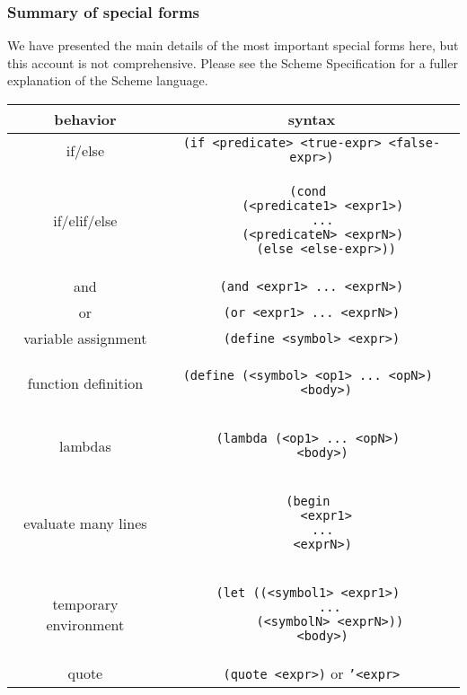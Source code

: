 \subsubsection{Summary of special forms}
We have presented the main details of the most important special forms here, but this account is not comprehensive. Please see the Scheme Specification for a fuller explanation of the Scheme language. 
\vspace{0.2in}
\begin{center}
\begin{tabular}{ |c|c| }
    \hline
    behavior & syntax \\
    \hline
    if/else & \texttt{(if <predicate> <true-expr> <false-expr>)}  \\
    \hline
    if/elif/else  
& \begin{lstlisting}
(cond 
    (<predicate1> <expr1>) 
    ... 
    (<predicateN> <exprN>) 
    (else <else-expr>))
\end{lstlisting} \\
    \hline
    and & \texttt{(and <expr1> ... <exprN>)} \\
    \hline
    or & \texttt{(or <expr1> ... <exprN>)} \\
    \hline
    variable assignment   & \texttt{(define <symbol> <expr>)} \\
    \hline
    function definition & 
\begin{lstlisting}
(define (<symbol> <op1> ... <opN>) 
    <body>)
\end{lstlisting}  \\
    \hline
    lambdas & 
\begin{lstlisting} 
(lambda (<op1> ... <opN>) 
    <body>) 
\end{lstlisting} \\
\hline
    evaluate many lines & 
\begin{lstlisting}
(begin 
    <expr1>
    ... 
    <exprN>) 
\end{lstlisting} \\
    \hline
    temporary environment & 
\begin{lstlisting} 
(let ((<symbol1> <expr1>) 
      ... 
      (<symbolN> <exprN>)) 
    <body>) 
\end{lstlisting}\\
    \hline
    quote & \texttt{(quote <expr>)} or \texttt{'<expr>}  \\
    \hline
\end{tabular}
\end{center}